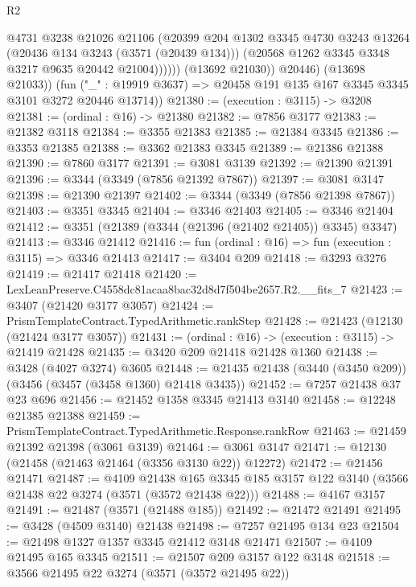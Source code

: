 \begin{lexlean}{R2}
\begin{coremodule}
                    @4731
                    @3238
                    @21026
                    @21106
                    (@20399
                      @204
                      @1302
                      @3345
                      @4730
                      @3243
                      @13264
                      (@20436 @134 @3243 (@3571 (@20439 @134)))
                      (@20568 @1262 @3345 @3348 @3217 @9635 @20442 @21004))))))
            (@13692 @21030))
          @20446)
        (@13698 @21033))
      (fun ("_" : @19919 @3637) => @20458 @191 @135 @167 @3345 @3345 @3101 @3272 @20446 @13714))
@21380 := (execution : @3115) -> @3208
@21381 := (ordinal : @16) -> @21380
@21382 := @7856 @3177
@21383 := @21382 @3118
@21384 := @3355 @21383
@21385 := @21384 @3345
@21386 := @3353 @21385
@21388 := @3362 @21383 @3345
@21389 := @21386 @21388
@21390 := @7860 @3177
@21391 := @3081 @3139
@21392 := @21390 @21391
@21396 := @3344 (@3349 (@7856 @21392 @7867))
@21397 := @3081 @3147
@21398 := @21390 @21397
@21402 := @3344 (@3349 (@7856 @21398 @7867))
@21403 := @3351 @3345
@21404 := @3346 @21403
@21405 := @3346 @21404
@21412 := @3351 (@21389 (@3344 (@21396 (@21402 @21405)) @3345) @3347)
@21413 := @3346 @21412
@21416 := fun (ordinal : @16) => fun (execution : @3115) => @3346 @21413
@21417 := @3404 @209
@21418 := @3293 @3276
@21419 := @21417 @21418
@21420 := LexLeanPreserve.C4558dc81acaa8bac32d8d7f504be2657.R2.__fits_7
@21423 := @3407 (@21420 @3177 @3057)
@21424 := PrismTemplateContract.TypedArithmetic.rankStep
@21428 := @21423 (@12130 (@21424 @3177 @3057))
@21431 := (ordinal : @16) -> (execution : @3115) -> @21419 @21428
@21435 := @3420 @209 @21418 @21428 @1360
@21438 := @3428 (@4027 @3274) @3605
@21448 := @21435 @21438 (@3440 (@3450 @209)) (@3456 (@3457 (@3458 @1360) @21418 @3435))
@21452 := @7257 @21438 @37 @23 @696
@21456 := @21452 @1358 @3345 @21413 @3140
@21458 := @12248 @21385 @21388
@21459 := PrismTemplateContract.TypedArithmetic.Response.rankRow
@21463 := @21459 @21392 @21398 (@3061 @3139)
@21464 := @3061 @3147
@21471 := @12130 (@21458 (@21463 @21464 (@3356 @3130 @22)) @12272)
@21472 := @21456 @21471
@21487 := @4109
    @21438
    @165
    @3345
    @185
    @3157
    @122
    @3140
    (@3566 @21438 @22 @3274 (@3571 (@3572 @21438 @22)))
@21488 := @4167 @3157
@21491 := @21487 (@3571 (@21488 @185))
@21492 := @21472 @21491
@21495 := @3428 (@4509 @3140) @21438
@21498 := @7257 @21495 @134 @23
@21504 := @21498 @1327 @1357 @3345 @21412 @3148 @21471
@21507 := @4109 @21495 @165 @3345
@21511 := @21507 @209 @3157 @122 @3148
@21518 := @3566 @21495 @22 @3274 (@3571 (@3572 @21495 @22))

\end{coremodule}
\end{lexlean}
